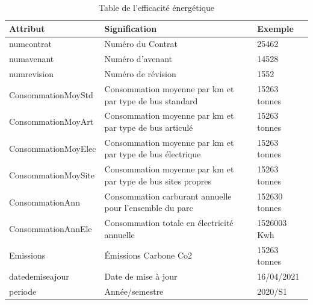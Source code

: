 \documentclass[a4paper]{report}
\begin{document}
\begin{doublespace}
	\begin{table}[H]
		\begin{center}
			\begin{tabularx}{17.5cm}{|p{4cm}|X|p{3cm}|}
				\hline
				\textbf{Attribut}   & \textbf{Signification}                                       & \textbf{Exemple} \\
				\hline
				numcontrat          & Numéro du Contrat                                            & 25462            \\
				\hline
				numavenant          & Numéro d'avenant                                             & 14528            \\
				\hline
				numrevision         & Numéro de révision                                           & 1552             \\
				\hline
				ConsommationMoyStd  & Consommation moyenne par km et par type de bus standard      & 15263 tonnes     \\
				\hline
				ConsommationMoyArt  & Consommation moyenne par km et par type de bus articulé      & 15263 tonnes     \\
				\hline
				ConsommationMoyElec & Consommation moyenne par km et par type de bus électrique    & 15263 tonnes     \\
				\hline
				ConsommationMoySite & Consommation moyenne par km et par type de bus sites propres & 15263 tonnes     \\
				\hline
				ConsommationAnn     & Consommation carburant annuelle pour l'ensemble du parc      & 152630 tonnes    \\
				\hline
				ConsommationAnnEle  & Consommation totale en électricité annuelle                  & 1526003 Kwh      \\
				\hline
				Emissions           & Émissions Carbone  Co2                                       & 15263 tonnes     \\
				\hline
				datedemiseajour     & Date de mise à jour                                          & 16/04/2021       \\
				\hline
				periode             & Année/semestre                                               & 2020/S1          \\
				\hline
			\end{tabularx}
			\caption{Table de l’efficacité énergétique}
		\end{center}
	\end{table}


\end{doublespace}
\end{document}
